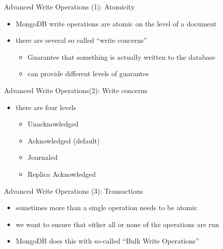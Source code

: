 \begin{frame}{Advanced Write Operations (1): Atomicity}
  \begin{itemize}
      \item MongoDB write operations are atomic on the level of a document
      \item there are several so called ``write concerns''
      \begin{itemize}
        \item Guarantee that something is actually written to the database
        \item can provide different levels of guarantee
      \end{itemize}
  \end{itemize}
\end{frame}

\begin{frame}{Advanced Write Operations(2): Write concerns}
  \begin{itemize}
    \item there are four levels
    \begin{itemize}
      \item Unacknowledged
      \item Acknowledged (default)
      \item Journaled
      \item Replica Acknowledged
    \end{itemize}
  \end{itemize}
\end{frame}

\begin{frame}{Advanced Write Operations (3): Transactions}
  \begin{itemize}
    \item sometimes more than a single operation needs to be atomic
    \item we want to ensure that either all or none of the operations are run
    \item MongoDB does this with so-called ``Bulk Write Operations''
  \end{itemize}
\end{frame}
